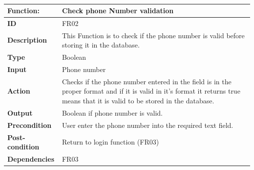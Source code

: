\documentclass[]{article}
\begin{document}
\FloatBarrier
\begin{table}[h]
\caption{ }
\label{tab:my-table}
\begin{tabular}{|p{}|p{}|}
\hline
\textbf{Function:} & Check phone Number validation
\\ \hline
\textbf{ID}  &            FR02

\\ \hline
\textbf{Description}    &     This Function is to check if the phone number is valid before storing it in the database.                                                                
\\ \hline
\textbf{Type}    &       Boolean  

\\ \hline
\textbf{Input}        & Phone number


\\ \hline
\textbf{Action}            & Checks if the phone number entered in the  field  is in the proper format and  if it is valid in it's format it returns true means that it is valid to be stored in the database.

\\ \hline
\textbf{Output}            & Boolean if phone number is valid.

\\ \hline
\textbf{Precondition}           &   User enter the phone number into the required text field.

\\ \hline
\textbf{Post-condition}           & Return to login function (FR03)


\\ \hline
\textbf{Dependencies}           & FR03
\\ \hline
\end{tabular}
\end{table}
\end{document}
